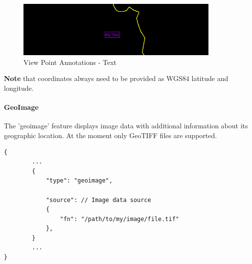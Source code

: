 \begin{figure}[H]
    \center
        \includegraphics[width=10cm]{figures/viewpoints_anno_example_text.png}
    \caption{View Point Annotations - Text} 
\end{figure}

\textbf{Note} that coordinates always need to be provided as WGS84 latitude and longitude. \\

\paragraph{GeoImage} The 'geoimage' feature displays image data with additional information about its geographic location.
At the moment only GeoTIFF files are supported.

\begin{lstlisting}[basicstyle=\small\ttfamily]
{
        ...
        {
            "type": "geoimage",

            "source": // Image data source
            {
                "fn": "/path/to/my/image/file.tif"
            },
        }
        ...
}
\end{lstlisting}





